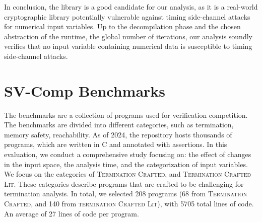 In conclusion, the \bignum{} library is a good candidate for our analysis, as it is a real-world cryptographic library potentially vulnerable against timing side-channel attacks for numerical input variables.
Up to the decompilation phase and the chosen abstraction of the runtime, \cf{} the global number of iterations, our analysis soundly verifies that no input variable containing numerical data is susceptible to timing side-channel attacks.


\section{SV-Comp Benchmarks}


The \svcomp{} benchmarks are a collection of programs used for verification competition.
The benchmarks are divided into different categories, such as termination, memory safety, reachability.
As of 2024, the \svcomp{} repository hosts thousands of programs, which are written in C and annotated with assertions.
In this evaluation, we conduct a comprehensive study focusing on: the effect of changes in the input space, the analysis time, and the categorization of input variables.
We focus on the categories of \textsc{Termination Crafted}, and \textsc{Termination Crafted Lit}.
These categories describe programs that are crafted to be challenging for termination analysis.
In total, we selected 208 programs (68 from \textsc{Termination Crafted}, and 140 from \textsc{termination Crafted Lit}), with 5705 total lines of code. An average of 27 lines of code per program.


